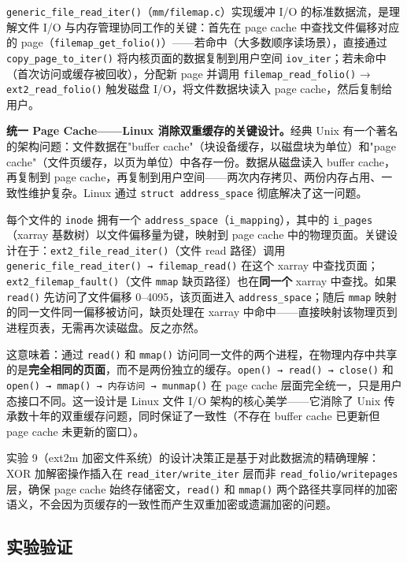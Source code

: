 \documentclass[a4paper]{article}
\begin{document}
\texttt{generic\_file\_read\_iter()}（\texttt{mm/filemap.c}）实现缓冲 I/O 的标准数据流，是理解文件 I/O 与内存管理协同工作的关键：首先在 page cache 中查找文件偏移对应的 page（\texttt{filemap\_get\_folio()}）——若命中（大多数顺序读场景），直接通过 \texttt{copy\_page\_to\_iter()} 将内核页面的数据复制到用户空间 \texttt{iov\_iter}；若未命中（首次访问或缓存被回收），分配新 page 并调用 \texttt{filemap\_read\_folio()} → \texttt{ext2\_read\_folio()} 触发磁盘 I/O，将文件数据块读入 page cache，然后复制给用户。

\textbf{统一 Page Cache——Linux 消除双重缓存的关键设计。}经典 Unix 有一个著名的架构问题：文件数据在"buffer cache"（块设备缓存，以磁盘块为单位）和"page cache"（文件页缓存，以页为单位）中各存一份。数据从磁盘读入 buffer cache，再复制到 page cache，再复制到用户空间——两次内存拷贝、两份内存占用、一致性维护复杂。Linux 通过 \texttt{struct address\_space} 彻底解决了这一问题。

每个文件的 \texttt{inode} 拥有一个 \texttt{address\_space}（\texttt{i\_mapping}），其中的 \texttt{i\_pages}（xarray 基数树）以文件偏移量为键，映射到 page cache 中的物理页面。关键设计在于：\texttt{ext2\_file\_read\_iter()}（文件 read 路径）调用 \texttt{generic\_file\_read\_iter() → filemap\_read()} 在这个 xarray 中查找页面；\texttt{ext2\_filemap\_fault()}（文件 \texttt{mmap} 缺页路径）也在\textbf{同一个} xarray 中查找。如果 \texttt{read()} 先访问了文件偏移 0–4095，该页面进入 \texttt{address\_space}；随后 \texttt{mmap} 映射的同一文件同一偏移被访问，缺页处理在 xarray 中命中——直接映射该物理页到进程页表，无需再次读磁盘。反之亦然。

这意味着：通过 \texttt{read()} 和 \texttt{mmap()} 访问同一文件的两个进程，在物理内存中共享的是\textbf{完全相同的页面}，而不是两份独立的缓存。\texttt{open() → read() → close()} 和 \texttt{open() → mmap() → 内存访问 → munmap()} 在 page cache 层面完全统一，只是用户态接口不同。这一设计是 Linux 文件 I/O 架构的核心美学——它消除了 Unix 传承数十年的双重缓存问题，同时保证了一致性（不存在 buffer cache 已更新但 page cache 未更新的窗口）。

实验 9（ext2m 加密文件系统）的设计决策正是基于对此数据流的精确理解：XOR 加解密操作插入在 \texttt{read\_iter/write\_iter} 层而非 \texttt{read\_folio/writepages} 层，确保 page cache 始终存储密文，\texttt{read()} 和 \texttt{mmap()} 两个路径共享同样的加密语义，不会因为页缓存的一致性而产生双重加密或遗漏加密的问题。

\subsection{实验验证}
\end{document}
